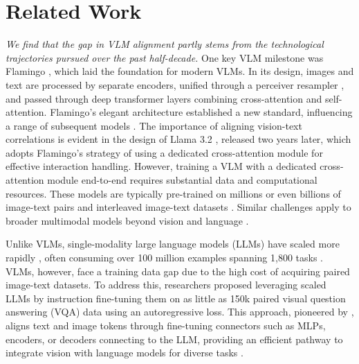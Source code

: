 \section{Related Work}
\label{sec:related_work}

\emph{We find that the gap in VLM alignment partly stems from the technological trajectories pursued over the past half-decade.}  
One key VLM milestone was Flamingo \cite{alayrac2022flamingo}, which laid the foundation for modern VLMs. In its design, images and text are processed by separate encoders, unified through a perceiver resampler \cite{jaegle2021perceiver}, and passed through deep transformer layers combining cross-attention and self-attention. Flamingo's elegant architecture established a new standard, influencing a range of subsequent models \cite{li2022blip, li2023blip, you2023ferret}.  
%
The importance of aligning vision-text correlations is evident in the design of Llama 3.2 \cite{dubey2024llama}, released two years later, which adopts Flamingo’s strategy of using a dedicated cross-attention module for effective interaction handling. However, training a VLM with a dedicated cross-attention module end-to-end requires substantial data and computational resources. These models are typically pre-trained on millions or even billions of image-text pairs and interleaved image-text datasets \cite{zhu2024multimodal}. 
Similar challenges apply to broader multimodal models beyond vision and language \cite{lu2024unified}.

Unlike VLMs, single-modality large language models (LLMs) have scaled more rapidly \cite{ouyang2022training, brown2020language, chowdhery2023palm}, often consuming over 100 million examples spanning 1,800 tasks \cite{longpre2023flan}. VLMs, however, face a training data gap due to the high cost of acquiring paired image-text datasets.  
%
To address this, researchers proposed leveraging scaled LLMs by instruction fine-tuning them on as little as 150k paired visual question answering (VQA) data using an autoregressive loss. This approach, pioneered by \citet{zhu2023minigpt, dai2023instructblipgeneralpurposevisionlanguagemodels, liu2024visual}, aligns text and image tokens through fine-tuning connectors such as MLPs, encoders, or decoders connecting to the LLM, providing an efficient pathway to integrate vision with language models for diverse tasks \cite{wang2024qwen2, li2024llava, koh2024generating, chen2025sharegpt4v, wang2024visionllm, chen2023tem, huang2024segment, liu2024universal, gao2023llama, cha2024honeybee}.

